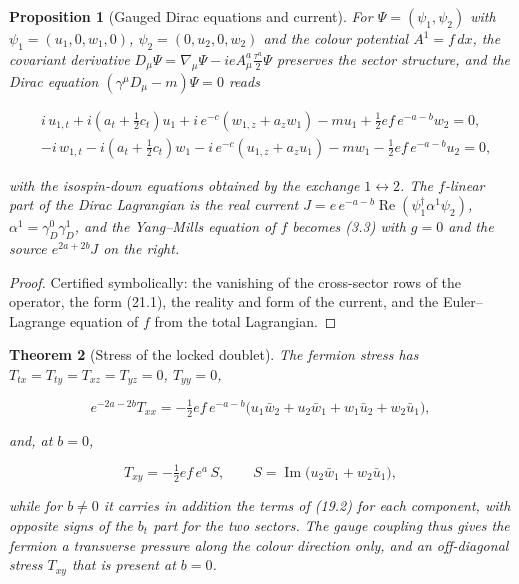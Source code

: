 \documentclass[11pt]{article}
\newtheorem{theorem}{Theorem}[section]
\newtheorem{proposition}[theorem]{Proposition}
\theoremstyle{remark}
\begin{document}
\begin{proposition}[Gauged Dirac equations and current]
\label{prop:v20v18-doublet}
For \(\Psi=(\psi_1,\psi_2)\) with \(\psi_1=(u_1,0,w_1,0)\), \(\psi_2=(0,u_2,0,w_2)\)
and the colour potential \(A^1=f\,dx\), the covariant derivative
\(D_\mu\Psi=\nabla_\mu\Psi-ieA^a_\mu\tfrac{\tau^a}2\Psi\) preserves the
sector structure, and the Dirac equation
\((\gamma^\mu D_\mu-m)\Psi=0\) reads

\[
\begin{aligned}
 &i\,u_{1,t}+i(a_t+\tfrac12c_t)u_1+i\,e^{-c}(w_{1,z}+a_zw_1)-mu_1+\tfrac12ef\,e^{-a-b}w_2=0,\\
 &-i\,w_{1,t}-i(a_t+\tfrac12c_t)w_1-i\,e^{-c}(u_{1,z}+a_zu_1)-mw_1-\tfrac12ef\,e^{-a-b}u_2=0,
\end{aligned}                                                          \tag{21.1}
\]

with the isospin-down equations obtained by the exchange
\(1\leftrightarrow2\).  The \(f\)-linear part of the Dirac Lagrangian is
the real current \(J=e\,e^{-a-b}\operatorname{Re}(\psi_1^\dagger\alpha^1\psi_2)\),
\(\alpha^1=\gamma^0_D\gamma^1_D\), and the Yang--Mills equation of \(f\)
becomes (3.3) with \(g=0\) and the source \(e^{2a+2b}J\) on the right.
\end{proposition}

\begin{proof}
Certified symbolically: the vanishing of the cross-sector rows of the
operator, the form (21.1), the reality and form of the current, and
the Euler--Lagrange equation of \(f\) from the total Lagrangian.
\end{proof}

\begin{theorem}[Stress of the locked doublet]
\label{thm:v20v18-stress}
The fermion stress has \(T_{tx}=T_{ty}=T_{xz}=T_{yz}=0\), \(T_{yy}=0\),

\[
 e^{-2a-2b}T_{xx}=-\tfrac12ef\,e^{-a-b}\bigl(u_1\bar w_2+u_2\bar w_1+w_1\bar u_2+w_2\bar u_1\bigr),
                                                                    \tag{21.2}
\]

and, at \(b=0\),

\[
 T_{xy}=-\tfrac12ef\,e^{a}\,S,\qquad S=\operatorname{Im}\bigl(u_2\bar w_1+w_2\bar u_1\bigr),
                                                                    \tag{21.3}
\]

while for \(b\neq0\) it carries in addition the terms of (19.2) for
each component, with opposite signs of the \(b_t\) part for the two
sectors.  The gauge coupling thus gives the fermion a transverse
pressure along the colour direction only, and an off-diagonal stress
\(T_{xy}\) that is present at \(b=0\).
\end{theorem}
\end{document}
